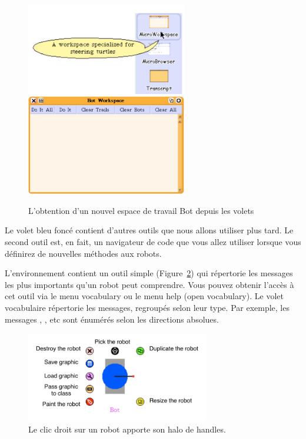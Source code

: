 \documentclass[a4paper,10pt,twoside]{book}
\begin{document}
\begin{figure}[!h]
\begin{center}
\includegraphics[width=7cm]{smallcaroflap}\hfill\includegraphics[width=7cm]{FullTurtleWorkspace}
\caption{L'obtention d'un nouvel espace de travail Bot depuis les volets \label{fig:caroflaps}}
\end{center}
\end{figure}

Le volet bleu fonc\'e contient d'autres outils que nous allons utiliser plus tard. Le second outil est, en fait, un navigateur de code que vous allez utiliser lorsque vous d\'efinirez de nouvelles  m\'ethodes aux robots. 

L'environnement contient un outil simple (Figure~\ref{fig:rohals}) qui r\'epertorie les messages les plus importants qu'un robot peut comprendre. Vous pouvez obtenir l'acc\`es \`a cet outil via le menu  vocabulary ou le menu help (open vocabulary). Le volet vocabulaire r\'epertorie les messages, regroup\'es selon leur type. Par exemple, les messages , , etc sont \'enum\'er\'es selon  les directions absolues. 

\begin{figure}[!h]
\begin{center}
\includegraphics[width=8cm]{picaAllHaloAnnotated}
\caption{Le clic droit sur un robot apporte son halo de handles.\label{fig:rohals}}
\end{center}
\end{figure}
\end{document}
